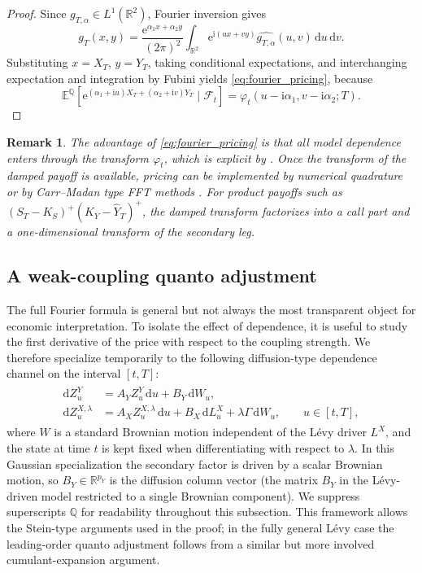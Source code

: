 \documentclass[10pt,reqno]{amsart}
\newtheorem{remark}[theorem]{Remark}
\newcommand{\R}{\mathbb{R}}
\newcommand{\E}{\mathbb{E}}
\newcommand{\Q}{\mathbb{Q}}
\newcommand{\F}{\mathcal{F}}
\newcommand{\1}{\mathbbm{1}}
\newcommand{\dd}{\mathrm{d}}
\newcommand{\ii}{\mathrm{i}}
\newcommand{\ee}{\mathrm{e}}
\begin{document}
\begin{proof}
Since $g_{T,\alpha} \in L^1(\R^2)$, Fourier inversion gives
$$
g_T(x,y)
= \frac{\ee^{\alpha_1 x+\alpha_2 y}}{(2\pi)^2}
   \int_{\R^2}
      \ee^{\ii(ux+vy)} \widehat{g_{T,\alpha}}(u,v)\,\dd u\,\dd v.
$$
Substituting $x=X_T$, $y=Y_T$, taking conditional expectations, and
interchanging expectation and integration by Fubini yields
\eqref{eq:fourier_pricing}, because
$$
\E^\Q\!\left[
  \ee^{(\alpha_1+\ii u)X_T + (\alpha_2+\ii v)Y_T}
  \mid \F_t
\right]
= \varphi_t(u-\ii\alpha_1,v-\ii\alpha_2;T).
$$
\end{proof}

\begin{remark}
The advantage of \eqref{eq:fourier_pricing} is that all model dependence enters
through the transform $\varphi_t$, which is explicit by
. Once the transform of the damped payoff is available,
pricing can be implemented by numerical quadrature or by Carr--Madan type FFT
methods \citep{Car99}. For product payoffs such as
$(S_T-K_S)^+(K_Y-\widehat{Y}_T)^+$, the damped transform factorizes into a call part and
a one-dimensional transform of the secondary leg.
\end{remark}

\subsection{A weak-coupling quanto adjustment}

The full Fourier formula is general but not always the most transparent object
for economic interpretation. To isolate the effect of dependence, it is useful
to study the first derivative of the price with respect to the coupling
strength. We therefore specialize temporarily to the following diffusion-type
dependence channel on the interval $[t,T]$:
\begin{align}\label{eq:weak_coupling_model}
\begin{aligned}
  \dd Z_u^{Y}
    &= A_Y Z_u^{Y}\,\dd u + B_Y\,\dd W_u,\\
  \dd Z_u^{X,\lambda}
    &= A_X Z_u^{X,\lambda}\,\dd u
       + B_X\,\dd L_u^X
       + \lambda \Gamma\,\dd W_u,
  \qquad u \in [t,T],
\end{aligned}
\end{align}
where $W$ is a standard Brownian motion independent of the Lévy driver
$L^X$, and the state at time $t$ is kept fixed when differentiating with
respect to $\lambda$. In this Gaussian specialization the secondary factor is
driven by a scalar Brownian motion, so $B_Y \in \R^{p_Y}$ is the diffusion
column vector (the matrix $B_Y$ in the
Lévy-driven model restricted to a single Brownian component). We suppress
superscripts $\Q$ for readability throughout this subsection. This framework
allows the Stein-type arguments used in the proof; in the fully general Lévy
case the leading-order quanto adjustment follows from a
similar but more involved cumulant-expansion argument.
\end{document}

